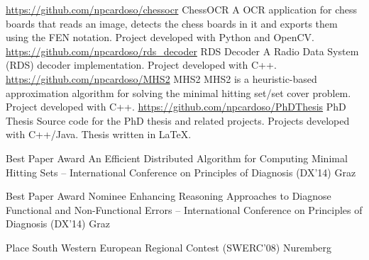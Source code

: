 \documentclass[11pt, a4paper]{awesome-cv}
\begin{document}
\begin{cventries}
  \cventry
  {\url{https://github.com/npcardoso/chessocr}}
  {ChessOCR}
  {}
  {}
  {
A OCR application for chess boards that reads an image, detects the chess boards
in it and exports them using the FEN notation.
Project developed with Python and OpenCV. }
  \cventry
  {\url{https://github.com/npcardoso/rds_decoder}}
  {RDS Decoder}
  {}
  {}
  {A Radio Data System (RDS) decoder implementation. Project developed with C++.}
  \cventry
  {\url{https://github.com/npcardoso/MHS2}}
  {MHS2}
  {}
  {}
  {MHS2 is a heuristic-based approximation algorithm for solving the minimal hitting set/set cover problem. Project developed with C++.}
  \cventry
  {\url{https://github.com/npcardoso/PhDThesis}}
  {PhD Thesis}
  {}
  {}
  {Source code for the PhD thesis and related projects. Projects developed with C++/Java. Thesis written in \LaTeX.}
\end{cventries}

\begin{cvhonors}
  \cvhonor
  {Best Paper Award}
  {An Efficient Distributed Algorithm for Computing Minimal Hitting Sets --  International Conference on Principles of Diagnosis (DX'14)}
  {Graz}
  {}

  \cvhonor
  {Best Paper Award Nominee}
  {Enhancing Reasoning Approaches to Diagnose Functional and Non-Functional Errors --  International Conference on Principles of Diagnosis (DX'14)}
  {Graz}
  {}
\end{cvhonors}


\begin{cvhonors}
  \cvhonor
  { Place}
  {South Western European Regional Contest (SWERC'08)}
  {Nuremberg}
  {}
\end{cvhonors}


\end{document}
